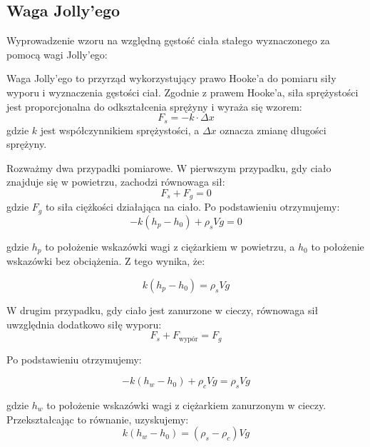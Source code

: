 \documentclass[a4paper,12pt]{article}
\begin{document}
\subsection*{Waga Jolly'ego}

Wyprowadzenie wzoru na względną gęstość ciała stałego wyznaczonego za pomocą wagi Jolly'ego:

Waga Jolly'ego to przyrząd wykorzystujący prawo Hooke'a do pomiaru siły wyporu i wyznaczenia gęstości ciał. Zgodnie z prawem Hooke'a, siła sprężystości jest proporcjonalna do odkształcenia sprężyny i wyraża się wzorem:
\begin{equation*}
    F_s = -k \cdot \Delta x
\end{equation*}
gdzie $k$ jest współczynnikiem sprężystości, a $\Delta x$ oznacza zmianę długości sprężyny.

Rozważmy dwa przypadki pomiarowe. W pierwszym przypadku, gdy ciało znajduje się w powietrzu, zachodzi równowaga sił:
\begin{equation*}
    F_s + F_g = 0
\end{equation*}
gdzie $F_g$ to siła ciężkości działająca na ciało. Po podstawieniu otrzymujemy:
\begin{equation*}
    -k(h_p - h_0) + \rho_{s} V g = 0
\end{equation*}

gdzie $h_p$ to położenie wskazówki wagi z ciężarkiem w powietrzu, a $h_0$ to położenie wskazówki bez obciążenia. Z tego wynika, że:

\begin{equation}
    \label{eq:case1}
    k(h_p - h_0) = \rho_{s} V g
\end{equation}

W drugim przypadku, gdy ciało jest zanurzone w cieczy, równowaga sił uwzględnia dodatkowo siłę wyporu:
\begin{equation*}
    F_s + F_{\text{wypór}} = F_g
\end{equation*}

Po podstawieniu otrzymujemy:

\begin{equation*}
    -k(h_w - h_0) + \rho_{c} V g = \rho_{s} V g
\end{equation*}

gdzie $h_w$ to położenie wskazówki wagi z ciężarkiem zanurzonym w cieczy. Przekształcając to równanie, uzyskujemy:
\begin{equation}
    \label{eq:case2}
    k(h_w - h_0) = (\rho_{s} - \rho_{c}) V g
\end{equation}
\end{document}
